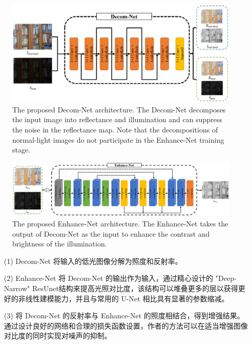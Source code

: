 \documentclass[letterpaper,10pt]{article}
\begin{document}
			\begin{figure}[htbp]
				\centering 
				\includegraphics[width=0.8\columnwidth]{picture/LLIE/Decom-Net}
				\caption{
					\label{fig: Decom-Net} 
					The proposed Decom-Net architecture. The Decom-Net decomposes the input image into reflectance and illumination and can suppress the noise in the reflectance map.
					Note that the decompositions of normal-light images do not participate in the Enhance-Net training stage.
				}
			\end{figure}
			
			\begin{figure}[htbp]
				\centering 
				\includegraphics[width=\columnwidth]{picture/LLIE/Enhance-Net}
				\caption{
					\label{fig: Enhance-Net} 
					The proposed Enhance-Net architecture. The Enhance-Net takes the output of Decom-Net as the input to enhance the contrast and brightness of the illumination.
				}
			\end{figure}
			
			\begin{itemize}
				\item[(1)] 
				Decom-Net 将输入的低光图像分解为照度和反射率。
				
				\item[(2)]
				Enhance-Net 将 Decom-Net 的输出作为输入，通过精心设计的 "Deep-Narrow" ResUnet结构来提高光照对比度，该结构可以堆叠更多的层以获得更好的非线性建模能力，并且与常用的 U-Net 相比具有显著的参数缩减。
				
				\item[(3)]
				将 Decom-Net 的反射率与 Enhance-Net 的照度相结合，得到增强结果。通过设计良好的网络和合理的损失函数设置，作者的方法可以在适当增强图像对比度的同时实现对噪声的抑制。
			\end{itemize}	
			
\end{document}
